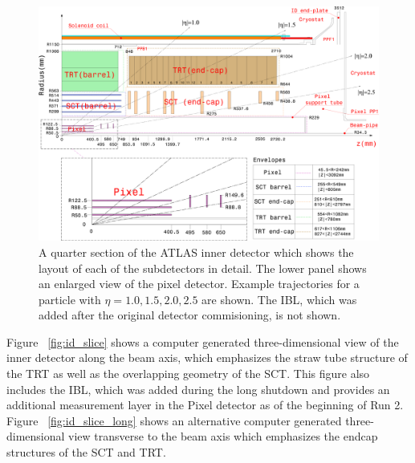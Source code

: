 \begin{figure}[hbtp]
\includegraphics[width=\fullfig]{figures/id_detail_schematic.pdf}
\caption{A quarter section of the \ac{ATLAS} inner detector which shows the layout of each of the subdetectors in detail. The lower panel shows an enlarged view of the pixel detector. Example trajectories for a particle with $\eta = 1.0, 1.5, 2.0, 2.5$ are shown. The \ac{IBL}, which was added after the original detector commisioning, is not shown.}
\label{fig:id_detail_schematic}
\end{figure}

Figure ~\ref{fig:id_slice} shows a computer generated three-dimensional view of the inner detector along the beam axis, which emphasizes the straw tube structure of the \ac{TRT} as well as the overlapping geometry of the \ac{SCT}.
This figure also includes the \ac{IBL}, which was added during the long shutdown and provides an additional measurement layer in the Pixel detector as of the beginning of Run 2. 
Figure ~\ref{fig:id_slice_long} shows an alternative computer generated three-dimensional view transverse to the beam axis which emphasizes the endcap structures of the \ac{SCT} and \ac{TRT}. 

